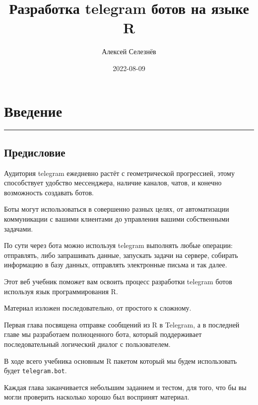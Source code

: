 \documentclass[
]{book}
\title{Разработка telegram ботов на языке R}
\author{Алексей Селезнёв}
\date{2022-08-09}
\begin{document}
\maketitle

{
\setcounter{tocdepth}{1}
\tableofcontents
}
\hypertarget{ux432ux432ux435ux434ux435ux43dux438ux435}{%
\chapter*{Введение}\label{ux432ux432ux435ux434ux435ux43dux438ux435}}

\begin{center}\rule{0.5\linewidth}{0.5pt}\end{center}

\hypertarget{ux43fux440ux435ux434ux438ux441ux43bux43eux432ux438ux435}{%
\section*{Предисловие}\label{ux43fux440ux435ux434ux438ux441ux43bux43eux432ux438ux435}}

Аудитория telegram ежедневно растёт с геометрической прогрессией, этому способствует удобство мессенджера, наличие каналов, чатов, и конечно возможность создавать ботов.

Боты могут использоваться в совершенно разных целях, от автоматизации коммуникации с вашими клиентами до управления вашими собственными задачами.

По сути через бота можно используя telegram выполнять любые операции: отправлять, либо запрашивать данные, запускать задачи на сервере, собирать информацию в базу данных, отправлять электронные письма и так далее.

Этот веб учебник поможет вам освоить процесс разработки telegram ботов используя язык программирования R.

Материал изложен последовательно, от простого к сложному.

Первая глава посвящена отправке сообщений из R в Telegram, а в последней главе мы разработаем полноценного бота, который поддерживает последовательный логический диалог с пользователем.

В ходе всего учебника основным R пакетом который мы будем использовать будет \texttt{telegram.bot}.

Каждая глава заканчивается небольшим заданием и тестом, для того, что бы вы могли проверить насколько хорошо был воспринят материал.
\end{document}
